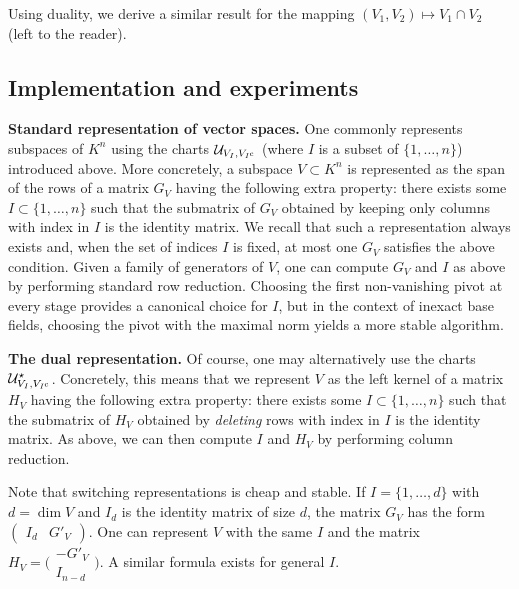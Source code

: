 \documentclass{sig-alternate}
\renewcommand{\c}{\text{\rm c}}
\begin{document}
Using duality, we derive a similar result for the mapping 
$(V_1, V_2) \mapsto V_1 \cap V_2$ (left to the reader).

\subsection{Implementation and experiments}
\label{grassimpl}

\noindent
{\bf Standard representation of vector spaces.}  %
One commonly represents subspaces of $K^n$  
using the charts $\mathcal U_{V_I, V_{I^\c}}$ (where $I$ is a subset 
of $\{1, \ldots, n\}$) introduced above. More concretely,
a subspace $V \subset K^n$ is represented as the span of the rows
of a matrix $G_V$ having the following extra property: there 
exists some $I \subset \{1, \ldots, n\}$ such that the submatrix of 
$G_V$ obtained by keeping only columns with index in $I$ is the identity 
matrix. We recall that such a representation always exists and, when 
the set of indices $I$ is fixed, at most one $G_V$ satisfies the above condition.
Given a family of generators of $V$, one can compute $G_V$ and $I$ as 
above by performing standard row reduction.  Choosing the first non-vanishing
pivot at every stage provides a canonical choice for $I$, but in the context of
inexact base fields, choosing the pivot with the maximal norm yields
a more stable algorithm.

\smallskip

\noindent
{\bf The dual representation.}
Of course, one may alternatively use the charts $\mathcal U^\star_{V_I, 
V_{I^\c}}$. Concretely, this means that we represent $V$ as the left 
kernel of a matrix $H_V$ having the following extra property: there 
exists some $I \subset \{1, \ldots, n\}$ such that the submatrix of 
$H_V$ obtained by \emph{deleting} rows with index in $I$ is the identity 
matrix. As above, we can then compute $I$ and $H_V$ by performing 
column reduction.

Note that switching representations is cheap and stable.
If $I = \{1, \ldots, d\}$ with $d = \dim V$ and $I_d$ 
is the identity matrix of size $d$, the matrix $G_V$ has the form
$(\begin{matrix} I_d & G'_V \end{matrix})$.
One can represent $V$ with the same $I$ and the matrix
$H_V = \Big(\begin{matrix} -G'_V \\ I_{n-d} \end{matrix}\Big)$.
A similar formula exists for general $I$.
\end{document}
